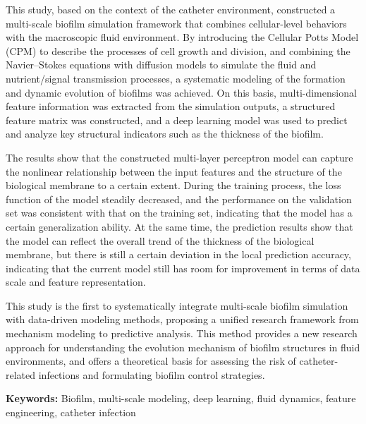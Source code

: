 \documentclass[12pt,a4paper,oneside]{report}
\begin{document}
This study, based on the context of the catheter environment, constructed a multi-scale biofilm simulation framework that combines cellular-level behaviors with the macroscopic fluid environment. By introducing the Cellular Potts Model (CPM) to describe the processes of cell growth and division, and combining the Navier--Stokes equations with diffusion models to simulate the fluid and nutrient/signal transmission processes, a systematic modeling of the formation and dynamic evolution of biofilms was achieved. On this basis, multi-dimensional feature information was extracted from the simulation outputs, a structured feature matrix was constructed, and a deep learning model was used to predict and analyze key structural indicators such as the thickness of the biofilm.

The results show that the constructed multi-layer perceptron model can capture the nonlinear relationship between the input features and the structure of the biological membrane to a certain extent. During the training process, the loss function of the model steadily decreased, and the performance on the validation set was consistent with that on the training set, indicating that the model has a certain generalization ability. At the same time, the prediction results show that the model can reflect the overall trend of the thickness of the biological membrane, but there is still a certain deviation in the local prediction accuracy, indicating that the current model still has room for improvement in terms of data scale and feature representation.

This study is the first to systematically integrate multi-scale biofilm simulation with data-driven modeling methods, proposing a unified research framework from mechanism modeling to predictive analysis. This method provides a new research approach for understanding the evolution mechanism of biofilm structures in fluid environments, and offers a theoretical basis for assessing the risk of catheter-related infections and formulating biofilm control strategies.

\noindent\textbf{Keywords:} Biofilm, multi-scale modeling, deep learning, fluid dynamics, feature engineering, catheter infection
\end{document}
